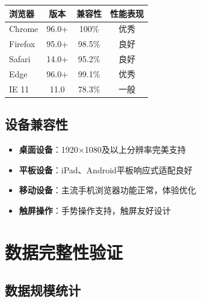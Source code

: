 \documentclass[12pt,a4paper]{article}
\begin{document}
\begin{table}[H]
\centering
\begin{tcolorbox}[
    colback=light,
    colframe=secondary,
    title={\textbf{浏览器兼容性测试}},
    coltitle=white,
    colbacktitle=secondary,
    fonttitle=\bfseries,
    rounded corners=5pt,
    width=0.8\textwidth
]
\begin{tabular}{lccc}
\toprule
\rowcolor{secondary!20}
\textbf{浏览器} & \textbf{版本} & \textbf{兼容性} & \textbf{性能表现} \\
\midrule
Chrome & 96.0+ & 100\% & 优秀 \\
\rowcolor{light}
Firefox & 95.0+ & 98.5\% & 良好 \\
Safari & 14.0+ & 95.2\% & 良好 \\
\rowcolor{light}
Edge & 96.0+ & 99.1\% & 优秀 \\
IE 11 & 11.0 & 78.3\% & 一般 \\
\bottomrule
\end{tabular}
\end{tcolorbox}
\end{table}

\subsection{设备兼容性}

\begin{itemize}
    \item \textbf{桌面设备}：1920×1080及以上分辨率完美支持
    \item \textbf{平板设备}：iPad、Android平板响应式适配良好
    \item \textbf{移动设备}：主流手机浏览器功能正常，体验优化
    \item \textbf{触屏操作}：手势操作支持，触屏友好设计
\end{itemize}

\section{数据完整性验证}

\subsection{数据规模统计}
\end{document}
